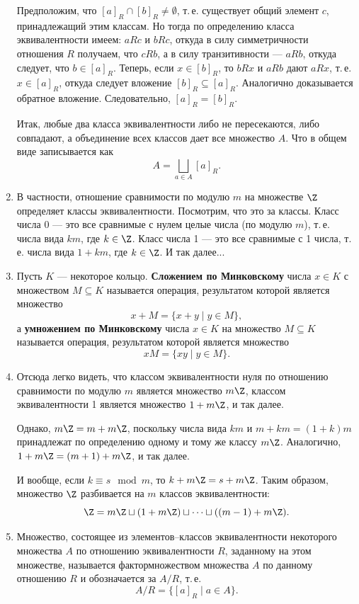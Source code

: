 \begin{enumerate}
Предположим, что $[a]_R\cap [b]_R\ne\emptyset$, т.\,е. существует общий элемент $c$, принадлежащий этим классам. Но тогда по определению класса эквивалентности имеем: $aRc$ и $bRc$, откуда в силу симметричности отношения $R$ получаем, что $cRb$, а в силу транзитивности --- $aRb$, откуда следует, что $b\in[a]_R$. Теперь, если $x\in[b]_R$, то $bRx$ и $aRb$ дают $aRx$, т.\,е. $x\in[a]_R$, откуда следует вложение $[b]_R\subseteq[a]_R$. Аналогично доказывается обратное вложение. Следовательно, $[a]_R=[b]_R$.

Итак, любые два класса эквивалентности либо не пересекаются, либо совпадают, а объединение всех классов дает все множество $A$. Что в общем виде записывается как
$$
A = \bigsqcup_{a\in A}[a]_R.
$$

\item В частности, отношение сравнимости по модулю $m$ на множестве $\Z$ определяет классы эквивалентности.
Посмотрим, что это за классы. Класс числа 0 --- это все сравнимые с нулем целые числа (по модулю $m$), т.\,е. числа вида $km$, где $k\in\Z$. Класс числа 1 --- это все сравнимые с 1 числа, т.\,е. числа вида $1+km$, где $k\in\Z$. И так далее...

\item Пусть $K$ --- некоторое кольцо. \textbf{Сложением по Минковскому} числа $x\in K$ с множеством $M\subseteq K$ называется операция, результатом которой является множество
$$
x+M = \{x+y\mid y\in M\},
$$
а \textbf{умножением по Минковскому} числа $x\in K$ на множество $M\subseteq K$ называется операция, результатом которой является множество
$$
xM = \{xy\mid y\in M\}.
$$

\item Отсюда легко видеть, что классом эквивалентности нуля по отношению сравнимости по модулю $m$ является множество $m\Z$, классом эквивалентности 1 является множество $1+m\Z$, и так далее.

Однако, $m\Z=m+m\Z$, поскольку числа вида $km$ и $m+km=(1+k)m$ принадлежат по определению одному и тому же классу $m\Z$. Аналогично, $1+m\Z=(m+1)+m\Z$, и так далее.

И вообще, если $k\equiv s\mod m$, то $k+m\Z=s+m\Z$. Таким образом, множество $\Z$ разбивается на $m$ классов эквивалентности:
$$
\Z = m\Z \sqcup (1+m\Z) \sqcup\dots \sqcup ((m-1)+m\Z).
$$

\item Множество, состоящее из элементов--классов эквивалентности некоторого множества $A$ по отношению эквивалентности $R$, заданному на этом множестве, называется фактормножеством множества $A$ по данному отношению $R$ и обозначается за $A/R$, т.\,е.
$$
A/R = \{[a]_R\mid a\in A\}.
$$


\end{enumerate}
